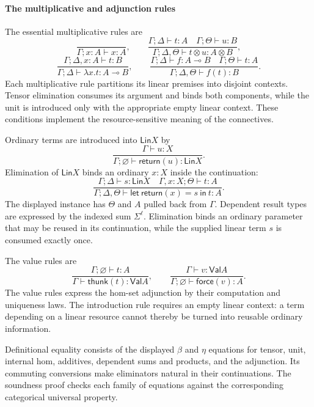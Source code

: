 \documentclass[11pt,a4paper]{article}
\numberwithin{equation}{section}
\theoremstyle{definition}
\theoremstyle{remark}
\theoremstyle{plain}
\providecommand{\Lin}{\mathsf{Lin}}
\providecommand{\Val}{\mathsf{Val}}
\providecommand{\ordturn}{\vdash}
\providecommand{\linturn}{\vdash}
\begin{document}
\paragraph{The multiplicative and adjunction rules}

The essential multiplicative rules are
\[
 \frac{}{\Gamma;x:A\linturn x:A},\qquad
 \frac{\Gamma;\Delta\linturn t:A\quad
       \Gamma;\Theta\linturn u:B}
      {\Gamma;\Delta,\Theta\linturn t\otimes u:A\otimes B},
\]
\[
 \frac{\Gamma;\Delta,x:A\linturn t:B}
      {\Gamma;\Delta\linturn\lambda x.t:A\multimap B},
 \qquad
 \frac{\Gamma;\Delta\linturn f:A\multimap B\quad
       \Gamma;\Theta\linturn t:A}
      {\Gamma;\Delta,\Theta\linturn f(t):B}.
\]
Each multiplicative rule partitions its linear premises into
disjoint contexts. Tensor elimination consumes its argument and binds
both components, while the unit is introduced only with the appropriate
empty linear context. These conditions implement the resource-sensitive
meaning of the connectives.

Ordinary terms are introduced into $\Lin X$ by
\[
 \frac{\Gamma\ordturn u:X}{\Gamma;\varnothing\linturn
        \mathsf{return}(u):\Lin X}.
\]
Elimination of $\Lin X$ binds an ordinary $x:X$ inside the continuation:
\begin{equation}
 \frac{\Gamma;\Delta\linturn s:\Lin X\quad
       \Gamma,x:X;\Theta\linturn t:A}
      {\Gamma;\Delta,\Theta\linturn
       \mathsf{let}\ \mathsf{return}(x)=s\ \mathsf{in}\ t:A}.
 \label{agt-eq-Felim}
\end{equation}
The displayed instance has $\Theta$ and $A$ pulled back from
$\Gamma$. Dependent result types are expressed by the indexed
sum $\Sigma^\ell$. Elimination binds an ordinary parameter that may
be reused in its continuation, while the supplied linear term $s$ is
consumed exactly once.

The value rules are
\[
 \frac{\Gamma;\varnothing\linturn t:A}
      {\Gamma\ordturn\mathsf{thunk}(t):\Val A},\qquad
 \frac{\Gamma\ordturn v:\Val A}
      {\Gamma;\varnothing\linturn\mathsf{force}(v):A}.
\]
The value rules express the hom-set adjunction by their computation
and uniqueness laws. The introduction rule requires an empty linear
context: a term depending on a linear resource cannot thereby be
turned into reusable ordinary information.

Definitional equality consists of the displayed $\beta$ and
$\eta$ equations for tensor, unit, internal hom, additives,
dependent sums and products, and the adjunction. Its commuting
conversions make eliminators natural in their continuations. The
soundness proof checks each family of equations against the
corresponding categorical universal property.
\end{document}
